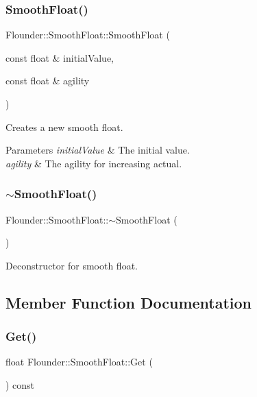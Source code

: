 \subsubsection{\texorpdfstring{Smooth\+Float()}{SmoothFloat()}}
{\footnotesize\ttfamily Flounder\+::\+Smooth\+Float\+::\+Smooth\+Float (\begin{DoxyParamCaption}\item[{const float \&}]{initial\+Value,  }\item[{const float \&}]{agility }\end{DoxyParamCaption})}



Creates a new smooth float. 


\begin{DoxyParams}{Parameters}
{\em initial\+Value} & The initial value. \\
\hline
{\em agility} & The agility for increasing actual. \\
\hline
\end{DoxyParams}
\mbox{\label{class_flounder_1_1_smooth_float_ad612a3199dc34ec2bc14744d1bb5c82c}} 
\subsubsection{\texorpdfstring{$\sim$\+Smooth\+Float()}{~SmoothFloat()}}
{\footnotesize\ttfamily Flounder\+::\+Smooth\+Float\+::$\sim$\+Smooth\+Float (\begin{DoxyParamCaption}{ }\end{DoxyParamCaption})}



Deconstructor for smooth float. 



\subsection{Member Function Documentation}
\mbox{\label{class_flounder_1_1_smooth_float_ad82bddc50cbf59958dcb6e4c9b6b02f2}} 
\subsubsection{\texorpdfstring{Get()}{Get()}}
{\footnotesize\ttfamily float Flounder\+::\+Smooth\+Float\+::\+Get (\begin{DoxyParamCaption}{ }\end{DoxyParamCaption}) const\hspace{0.3cm}{\ttfamily [inline]}}



